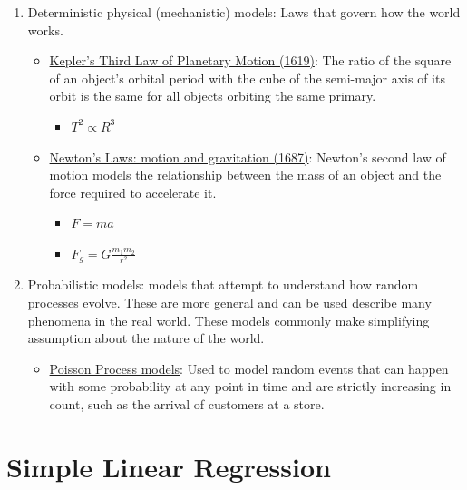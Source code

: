 \documentclass[
  letterpaper,
  DIV=11,
  numbers=noendperiod]{scrreprt}
\providecommand{\tightlist}{%
  \setlength{\itemsep}{0pt}\setlength{\parskip}{0pt}}\usepackage{longtable,booktabs,array}
\begin{document}
\begin{enumerate}
\def\labelenumi{\arabic{enumi}.}
\item
  Deterministic physical (mechanistic) models: Laws that govern how the
  world works.

  \begin{itemize}
  \tightlist
  \item
    \href{https://en.wikipedia.org/wiki/Kepler\%27s_laws_of_planetary_motion\#Third_law}{Kepler's
    Third Law of Planetary Motion (1619)}: The ratio of the square of an
    object's orbital period with the cube of the semi-major axis of its
    orbit is the same for all objects orbiting the same primary.

    \begin{itemize}
    \tightlist
    \item
      \(T^2 \propto R^3\)
    \end{itemize}
  \item
    \href{https://en.wikipedia.org/wiki/Newton\%27s_laws_of_motion}{Newton's
    Laws: motion and gravitation (1687)}: Newton's second law of motion
    models the relationship between the mass of an object and the force
    required to accelerate it.

    \begin{itemize}
    \tightlist
    \item
      \(F = ma\)
    \item
      \(F_g = G \frac{m_1 m_2}{r^2}\)
    \end{itemize}
  \end{itemize}
\item
  Probabilistic models: models that attempt to understand how random
  processes evolve. These are more general and can be used describe many
  phenomena in the real world. These models commonly make simplifying
  assumption about the nature of the world.

  \begin{itemize}
  \tightlist
  \item
    \href{https://en.wikipedia.org/wiki/Poisson_point_process}{Poisson
    Process models}: Used to model random events that can happen with
    some probability at any point in time and are strictly increasing in
    count, such as the arrival of customers at a store.
  \end{itemize}
\end{enumerate}

\hypertarget{simple-linear-regression}{%
\section{Simple Linear Regression}\label{simple-linear-regression}}
\end{document}
